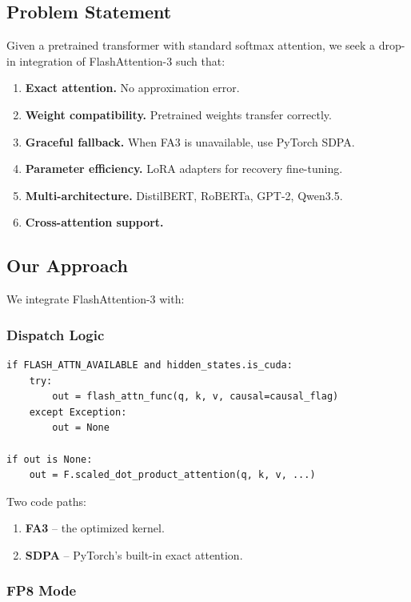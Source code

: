 \subsection{Problem Statement}

Given a pretrained transformer with standard softmax attention, we seek a 
drop-in integration of FlashAttention-3 such that:

\begin{enumerate}
\item \textbf{Exact attention.} No approximation error.
\item \textbf{Weight compatibility.} Pretrained weights transfer correctly.
\item \textbf{Graceful fallback.} When FA3 is unavailable, use PyTorch SDPA.
\item \textbf{Parameter efficiency.} LoRA adapters for recovery fine-tuning.
\item \textbf{Multi-architecture.} DistilBERT, RoBERTa, GPT-2, Qwen3.5.
\item \textbf{Cross-attention support.}

\end{enumerate}
\subsection{Our Approach}

We integrate FlashAttention-3 with:

\subsubsection{Dispatch Logic}

\begin{lstlisting}
if FLASH_ATTN_AVAILABLE and hidden_states.is_cuda:
    try:
        out = flash_attn_func(q, k, v, causal=causal_flag)
    except Exception:
        out = None

if out is None:
    out = F.scaled_dot_product_attention(q, k, v, ...)
\end{lstlisting}

Two code paths:
\begin{enumerate}
\item \textbf{FA3} -- the optimized kernel.
\item \textbf{SDPA} -- PyTorch's built-in exact attention.

\end{enumerate}
\subsubsection{FP8 Mode}

